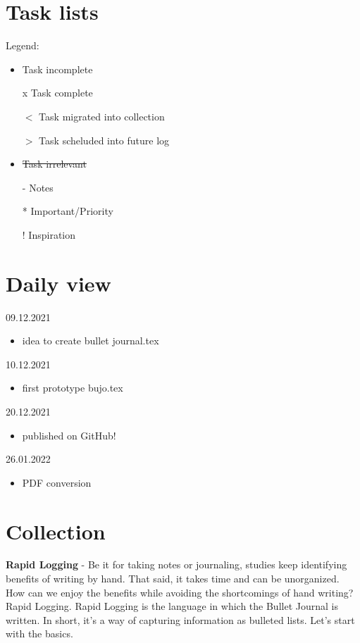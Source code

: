 \documentclass[a5paper]{article}
\begin{document}
\section{Task lists}
Legend:
\begin{itemize}
	\item Task incomplete
	\item[x] Task complete 
	\item[$<$] Task migrated into collection
	\item[$>$] Task scheluded into future log
	\item \sout{Task irrelevant} %
	\item[-] Notes
	\item[*] Important/Priority
	\item[!] Inspiration
\end{itemize}
\newpage
\section{Daily view}
09.12.2021
\begin{itemize}
	\item idea to create bullet journal.tex
\end{itemize}
10.12.2021
\begin{itemize}
	\item first prototype bujo.tex
\end{itemize}
20.12.2021
\begin{itemize}
	\item published on GitHub!
\end{itemize}
26.01.2022
\begin{itemize}
	\item PDF conversion
\end{itemize}
\newpage
\section{Collection}
\textbf{Rapid Logging} - Be it for taking notes or journaling, studies keep identifying benefits of writing by hand. That said, it takes time and can be unorganized. How can we enjoy the benefits while avoiding the shortcomings of hand writing? Rapid Logging. Rapid Logging is the language in which the Bullet Journal is written. In short, it's a way of capturing information as bulleted lists. Let's start with the basics.
\end{document}
